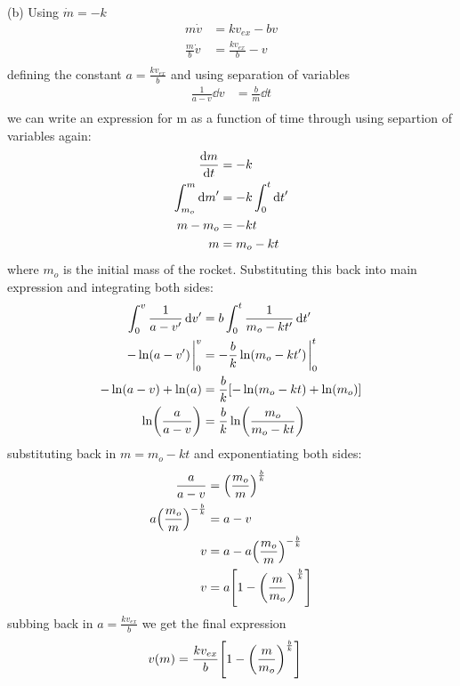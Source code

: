 \documentclass[../hw.tex]{subfiles}
\begin{document}
(b) Using $\dot m = -k$
\begin{align*}
  m \dot v &= k v_{ex} - bv \\
  \frac{m}{b} \dot v &= \frac{k v_{ex}}{b} - v \\
\end{align*}
defining the constant $a = \frac{k v_{ex}}{b}$ and using separation of variables
\begin{align*}
  \frac{1}{a - v} \dd{v} &= \frac{b}{m} \dd{t} \\
\end{align*}
we can write an expression for m as a function of time through using separtion of variables again:
\begin{align*}
  \dv{m}{t} &= -k \\
  \int_{m_o}^m \dd{m}' &= -k \int_0^t \dd{t}' \\
  m - m_o &= -kt \\
  m &= m_o - kt
\end{align*}
where $m_o$ is the initial mass of the rocket. Substituting this back into main expression and 
integrating both sides:
\begin{align*}
  \int_0^v \frac{1}{a - v'} \dd{v'} &= b \int_0^t \frac{1}{m_o - kt'} \dd{t'} \\
  -\ln(a - v') \eval_0^v &= -\frac{b}{k} \ln(m_o - kt') \eval_0^t \\
  -\ln(a - v) + \ln(a) &= \frac{b}{k} \qt[-\ln(m_o - kt) + \ln(m_o)] \\
  \ln(\frac{a}{a - v}) &= \frac{b}{k} \ln(\frac{m_o}{m_o - kt})
\end{align*}
substituting back in $m = m_o - kt$ and exponentiating both sides:
\begin{align*}
  \frac{a}{a - v} &= \qt(\frac{m_o}{m})^{\frac{b}{k}} \\
  a \qt(\frac{m_o}{m})^{-\frac{b}{k}} &= a - v \\
  v &= a - a \qt(\frac{m_o}{m})^{-\frac{b}{k}} \\
  v &= a \qt[1 - \qt(\frac{m}{m_o})^{\frac{b}{k}}]
\end{align*}
subbing back in $a = \frac{k v_{ex}}{b}$ we get the final expression
\begin{align*}
  v(m) &= \frac{k v_{ex}}{b} \qt[1 - \qt(\frac{m}{m_o})^{\frac{b}{k}}]
\end{align*}

\newpage
\end{document}
